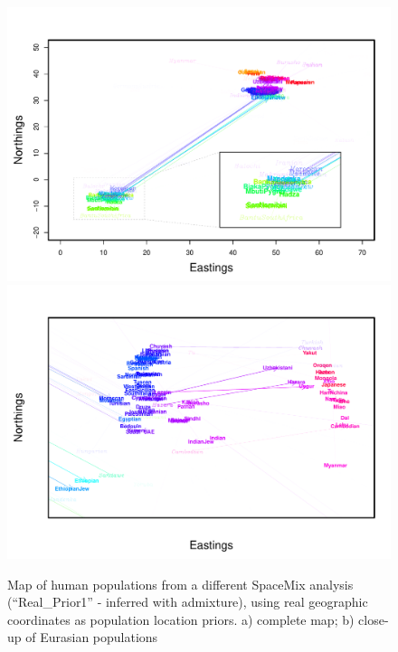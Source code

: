 \documentclass[12pt]{article}
\begin{document}
\begin{figure}
	\centering
			{\includegraphics[width=\textwidth,height=0.71\textwidth]{figs/globetrotter/globe_Ad_map_AfricaInset_realpr2.pdf}}
			{\includegraphics[width=\textwidth,height=0.71\textwidth]{figs/globetrotter/eurasia_Ad_map_indproc_realpr2.pdf}}
	\caption{Map of human populations from a different SpaceMix analysis (``Real\_Prior1'' - inferred with admixture), using real geographic coordinates as population location priors. a) complete map; b) close-up of Eurasian populations}
	\label{sfig:globe_ad_maps_realpr2}
\end{figure}
\end{document}

